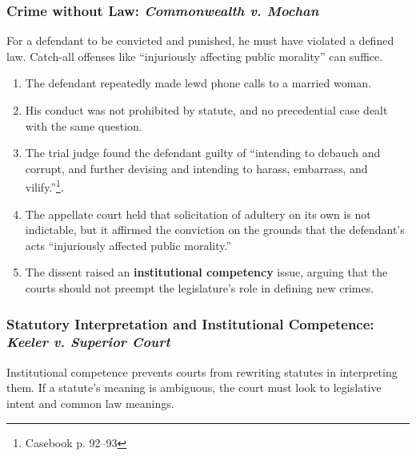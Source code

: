 \subsubsection{Crime without Law: \emph{Commonwealth v. Mochan}}

For a defendant to be convicted and punished, he must have violated a defined 
law. Catch-all offenses like ``injuriously affecting public morality'' can 
suffice.

\begin{enumerate}
    \item The defendant repeatedly made lewd phone calls to a married woman.
    \item His conduct was not prohibited by statute, and no precedential case 
    dealt with the same question.
    \item The trial judge found the defendant guilty of ``intending to debauch 
    and corrupt, and further devising and intending to harass, embarrass, and 
    vilify.''\footnote{Casebook p. 92--93}.
    \item The appellate court held that solicitation of adultery on its own is 
    not indictable, but it affirmed the conviction on the grounds that the 
    defendant's acts ``injuriously affected public morality.''
    \item The dissent raised an \textbf{institutional competency} issue, 
    arguing that the courts should not preempt the legislature's role in 
    defining new crimes.
\end{enumerate}

\subsubsection{Statutory Interpretation and Institutional Competence: 
\emph{Keeler v. Superior Court}}

Institutional competence prevents courts from rewriting statutes in 
interpreting them. If a statute's meaning is ambiguous, the court must look to 
legislative intent and common law meanings.

